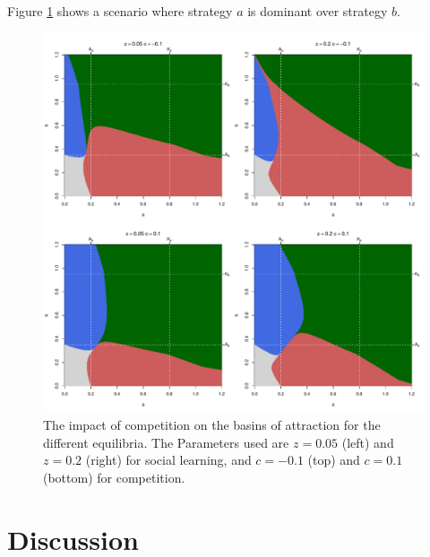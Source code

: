 \documentclass[3p,authoryear,twocolumn]{elsarticle} %
\begin{document}


Figure \ref{fig:competition} shows a scenario where strategy $a$ is dominant over strategy $b$.

\begin{figure}[h!]
  \centering
      \includegraphics[width=\textwidth]{./figures/figure7}
  \caption{The impact of competition on the basins of attraction for the different equilibria. The Parameters used are $z=0.05$ (left) and $z=0.2$ (right) for social learning, and $c=-0.1$ (top) and $c=0.1$ (bottom) for competition.}
    \label{fig:competition}
\end{figure}



\section{Discussion}

\end{document}
